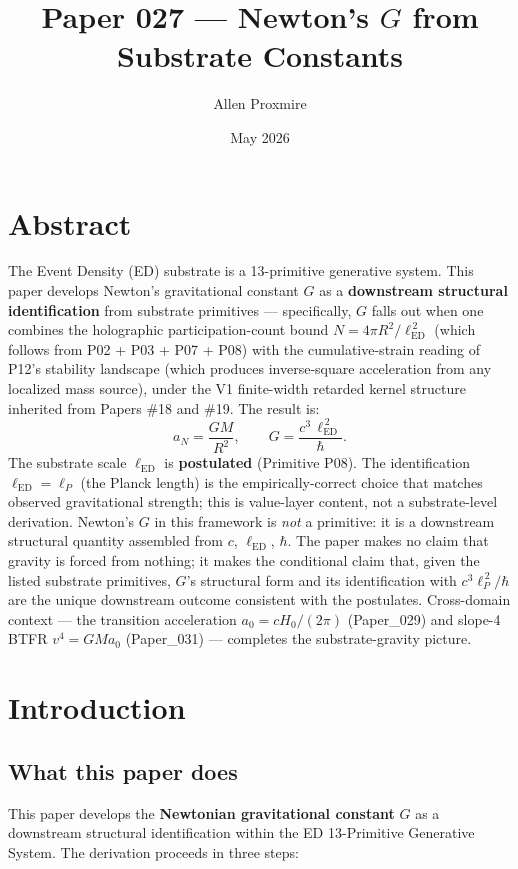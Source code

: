 \documentclass[11pt,a4paper]{article}
\title{\vspace{-1cm}\Large\bfseries Paper 027 --- Newton's $G$ from Substrate Constants}
\author{Allen Proxmire}
\date{May 2026}
\begin{document}
\maketitle

\section*{Abstract}

The Event Density (ED) substrate is a 13-primitive generative system. This paper develops Newton's gravitational constant $G$ as a \textbf{downstream structural identification} from substrate primitives --- specifically, $G$ falls out when one combines the holographic participation-count bound $N = 4\pi R^2/\ell_\mathrm{ED}^{\,2}$ (which follows from P02 + P03 + P07 + P08) with the cumulative-strain reading of P12's stability landscape (which produces inverse-square acceleration from any localized mass source), under the V1 finite-width retarded kernel structure inherited from Papers \#18 and \#19. The result is:
\[
a_N = \frac{GM}{R^2}, \qquad G = \frac{c^3\,\ell_\mathrm{ED}^{\,2}}{\hbar}.
\]
The substrate scale $\ell_\mathrm{ED}$ is \textbf{postulated} (Primitive P08). The identification $\ell_\mathrm{ED} = \ell_P$ (the Planck length) is the empirically-correct choice that matches observed gravitational strength; this is value-layer content, not a substrate-level derivation. Newton's $G$ in this framework is \emph{not} a primitive: it is a downstream structural quantity assembled from $c$, $\ell_\mathrm{ED}$, $\hbar$. The paper makes no claim that gravity is forced from nothing; it makes the conditional claim that, given the listed substrate primitives, $G$'s structural form and its identification with $c^3\ell_P^{\,2}/\hbar$ are the unique downstream outcome consistent with the postulates. Cross-domain context --- the transition acceleration $a_0 = cH_0/(2\pi)$ (Paper\_029) and slope-4 BTFR $v^4 = GMa_0$ (Paper\_031) --- completes the substrate-gravity picture.

\section{Introduction}

\subsection{What this paper does}

This paper develops the \textbf{Newtonian gravitational constant} $G$ as a downstream structural identification within the ED 13-Primitive Generative System. The derivation proceeds in three steps:
\end{document}
